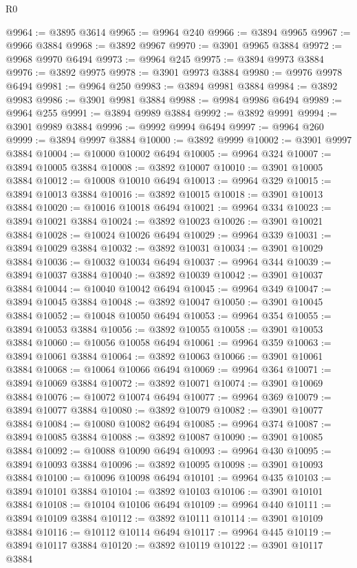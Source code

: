 \begin{lexlean}{R0}
\begin{coremodule}
@9964 := @3895 @3614
@9965 := @9964 @240
@9966 := @3894 @9965
@9967 := @9966 @3884
@9968 := @3892 @9967
@9970 := @3901 @9965 @3884
@9972 := @9968 @9970 @6494
@9973 := @9964 @245
@9975 := @3894 @9973 @3884
@9976 := @3892 @9975
@9978 := @3901 @9973 @3884
@9980 := @9976 @9978 @6494
@9981 := @9964 @250
@9983 := @3894 @9981 @3884
@9984 := @3892 @9983
@9986 := @3901 @9981 @3884
@9988 := @9984 @9986 @6494
@9989 := @9964 @255
@9991 := @3894 @9989 @3884
@9992 := @3892 @9991
@9994 := @3901 @9989 @3884
@9996 := @9992 @9994 @6494
@9997 := @9964 @260
@9999 := @3894 @9997 @3884
@10000 := @3892 @9999
@10002 := @3901 @9997 @3884
@10004 := @10000 @10002 @6494
@10005 := @9964 @324
@10007 := @3894 @10005 @3884
@10008 := @3892 @10007
@10010 := @3901 @10005 @3884
@10012 := @10008 @10010 @6494
@10013 := @9964 @329
@10015 := @3894 @10013 @3884
@10016 := @3892 @10015
@10018 := @3901 @10013 @3884
@10020 := @10016 @10018 @6494
@10021 := @9964 @334
@10023 := @3894 @10021 @3884
@10024 := @3892 @10023
@10026 := @3901 @10021 @3884
@10028 := @10024 @10026 @6494
@10029 := @9964 @339
@10031 := @3894 @10029 @3884
@10032 := @3892 @10031
@10034 := @3901 @10029 @3884
@10036 := @10032 @10034 @6494
@10037 := @9964 @344
@10039 := @3894 @10037 @3884
@10040 := @3892 @10039
@10042 := @3901 @10037 @3884
@10044 := @10040 @10042 @6494
@10045 := @9964 @349
@10047 := @3894 @10045 @3884
@10048 := @3892 @10047
@10050 := @3901 @10045 @3884
@10052 := @10048 @10050 @6494
@10053 := @9964 @354
@10055 := @3894 @10053 @3884
@10056 := @3892 @10055
@10058 := @3901 @10053 @3884
@10060 := @10056 @10058 @6494
@10061 := @9964 @359
@10063 := @3894 @10061 @3884
@10064 := @3892 @10063
@10066 := @3901 @10061 @3884
@10068 := @10064 @10066 @6494
@10069 := @9964 @364
@10071 := @3894 @10069 @3884
@10072 := @3892 @10071
@10074 := @3901 @10069 @3884
@10076 := @10072 @10074 @6494
@10077 := @9964 @369
@10079 := @3894 @10077 @3884
@10080 := @3892 @10079
@10082 := @3901 @10077 @3884
@10084 := @10080 @10082 @6494
@10085 := @9964 @374
@10087 := @3894 @10085 @3884
@10088 := @3892 @10087
@10090 := @3901 @10085 @3884
@10092 := @10088 @10090 @6494
@10093 := @9964 @430
@10095 := @3894 @10093 @3884
@10096 := @3892 @10095
@10098 := @3901 @10093 @3884
@10100 := @10096 @10098 @6494
@10101 := @9964 @435
@10103 := @3894 @10101 @3884
@10104 := @3892 @10103
@10106 := @3901 @10101 @3884
@10108 := @10104 @10106 @6494
@10109 := @9964 @440
@10111 := @3894 @10109 @3884
@10112 := @3892 @10111
@10114 := @3901 @10109 @3884
@10116 := @10112 @10114 @6494
@10117 := @9964 @445
@10119 := @3894 @10117 @3884
@10120 := @3892 @10119
@10122 := @3901 @10117 @3884

\end{coremodule}
\end{lexlean}
